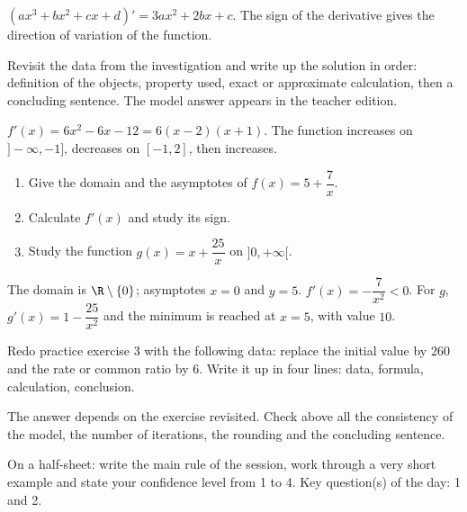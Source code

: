 \begin{summary}$(ax^3+bx^2+cx+d)'=3ax^2+2bx+c$. The sign of the derivative gives the direction of variation of the function.\end{summary}

\begin{example}
Revisit the data from the investigation and write up the solution in order: definition of the objects, property used, exact or approximate calculation, then a concluding sentence. The model answer appears in the teacher edition.
\end{example}
\begin{solution}$f'(x)=6x^2-6x-12=6(x-2)(x+1)$. The function increases on $]-\infty,-1]$, decreases on $[-1,2]$, then increases.\end{solution}

\begin{exercise}[essential]
\begin{enumerate}\item Give the domain and the asymptotes of $f(x)=5+\dfrac{7}x$.\item Calculate $f'(x)$ and study its sign.\item Study the function $g(x)=x+\dfrac{25}x$ on $]0,+\infty[$.\end{enumerate}
\end{exercise}
\begin{solution}The domain is $\R\setminus\{0\}$; asymptotes $x=0$ and $y=5$. $f'(x)=-\dfrac{7}{x^2}<0$. For $g$, $g'(x)=1-\dfrac{25}{x^2}$ and the minimum is reached at $x=5$, with value $10$.\end{solution}


\begin{homework}Redo practice exercise 3 with the following data: replace the initial value by $260$ and the rate or common ratio by $6$. Write it up in four lines: data, formula, calculation, conclusion.\end{homework}
\begin{solution}The answer depends on the exercise revisited. Check above all the consistency of the model, the number of iterations, the rounding and the concluding sentence.\end{solution}

\begin{exitticket}[3 minutes]On a half-sheet: write the main rule of the session, work through a very short example and state your confidence level from 1 to 4. Key question(s) of the day: 1 and 2.\end{exitticket}

